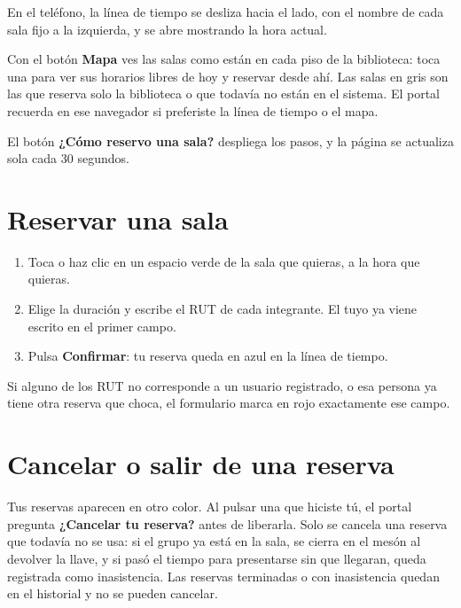 \documentclass[11pt,a4paper]{report}
\begin{document}

En el teléfono, la línea de tiempo se desliza hacia el lado, con el nombre
de cada sala fijo a la izquierda, y se abre mostrando la hora actual.

Con el botón \textbf{Mapa} ves las salas como están en cada piso de la
biblioteca: toca una para ver sus horarios libres de hoy y reservar desde
ahí. Las salas en gris son las que reserva solo la biblioteca o que
todavía no están en el sistema. El portal recuerda en ese navegador si
preferiste la línea de tiempo o el mapa.

El botón \textbf{¿Cómo reservo una sala?} despliega los pasos, y la página
se actualiza sola cada 30 segundos.

\section{Reservar una sala}

\begin{enumerate}
  \item Toca o haz clic en un espacio verde de la sala que quieras, a la
  hora que quieras.
  \item Elige la duración y escribe el RUT de cada integrante. El tuyo ya
  viene escrito en el primer campo.
  \item Pulsa \textbf{Confirmar}: tu reserva queda en azul en la línea de
  tiempo.
\end{enumerate}


Si alguno de los RUT no corresponde a un usuario registrado, o esa persona
ya tiene otra reserva que choca, el formulario marca en rojo exactamente
ese campo.

\section{Cancelar o salir de una reserva}

Tus reservas aparecen en otro color. Al pulsar una que hiciste tú, el
portal pregunta \textbf{¿Cancelar tu reserva?} antes de liberarla. Solo se
cancela una reserva que todavía no se usa: si el grupo ya está en la sala,
se cierra en el mesón al devolver la llave, y si pasó el tiempo para presentarse sin
que llegaran, queda registrada como inasistencia. Las reservas terminadas o
con inasistencia quedan en el historial y no se pueden cancelar.
\end{document}
